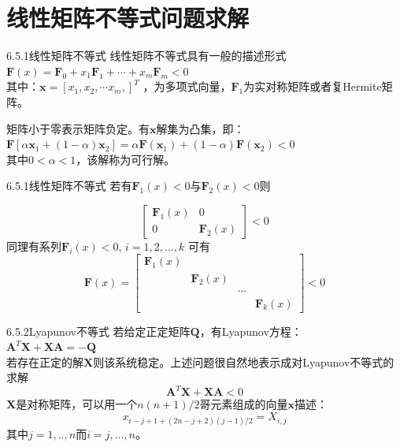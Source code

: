 \documentclass[10pt]{beamer}
\begin{document}
\section{线性矩阵不等式问题求解}

\begin{frame}[allowframebreaks]{6.5.1线性矩阵不等式}
  线性矩阵不等式具有一般的描述形式
  \\$\boldsymbol{F}\left ( x\right )=\boldsymbol{F}_{0}+x_{1}\boldsymbol{F}_{1}+\cdots +x_{m}\boldsymbol{F}_{m}< 0$
  \\其中：$\boldsymbol{x}=\left [ x_{1},x_{2},\cdots x_{m},\right ]^{T}$ ，为多项式向量，$\boldsymbol{F}_{1}$为实对称矩阵或者复Hermite矩阵。
  
  矩阵小于零表示矩阵负定。有$\boldsymbol{x}$解集为凸集，即：
  \\$ \boldsymbol{F}\left [ \alpha \boldsymbol{x}_{1}+\left ( 1-\alpha \right )\boldsymbol{x}_{2}\right ]=\alpha \boldsymbol{F}\left ( \boldsymbol{x}_{1} \right ) +\left ( 1-\alpha \right )\boldsymbol{F}\left ( \boldsymbol{x}_{2} \right )< 0$
  \\其中$0< \alpha < 1$，该解称为可行解。
  
  
  \end{frame}
  
  \begin{frame}[allowframebreaks]{6.5.1线性矩阵不等式}
  若有$\boldsymbol{F}_{1}\left ( x\right )< 0$与$\boldsymbol{F}_{2}\left ( x\right )< 0$则
  
  \[\begin{bmatrix}
  \boldsymbol{F}_{1}\left ( x\right ) & 0\\ 
  0 & \boldsymbol{F}_{2}\left ( x\right )
  \end{bmatrix}< 0\]
  同理有系列$\boldsymbol{F}_{i}\left ( x\right )< 0$, $i=1,2,...,k$
  可有\[\boldsymbol{F}\left ( x\right )=\begin{bmatrix}
  \boldsymbol{F}_{1}\left ( x\right ) &  &  & \\ 
  &  \boldsymbol{F}_{2}\left ( x\right ) & & \\ 
  &  & \cdots & \\ 
  &  &  & \boldsymbol{F}_{k}\left ( x\right )
  \end{bmatrix}< 0\]
  \end{frame}
  
  \begin{frame}[allowframebreaks]{6.5.2Lyapunov不等式}
  若给定正定矩阵$\boldsymbol{Q}$，有Lyapunov方程：
  \\$\boldsymbol{A}^{T}\boldsymbol{X}+\boldsymbol{X}\boldsymbol{A}=-\boldsymbol{Q}$
  \\若存在正定的解$\boldsymbol{X}$则该系统稳定。上述问题很自然地表示成对Lyapunov不等式的求解\[\boldsymbol{A}^{T}\boldsymbol{X}+\boldsymbol{X}\boldsymbol{A}< 0\]
  $\boldsymbol{X}$是对称矩阵，可以用一个$n\left ( n+1\right )/2$哥元素组成的向量$\boldsymbol{x}$描述：
  \[x_{i-j+1+\left ( 2n-j+2\right )\left ( j-1\right )/2}=X_{i,j}\]
  其中$j=1,..,n$而$i=j,...,n$。
  \end{frame}
  
\end{document}
